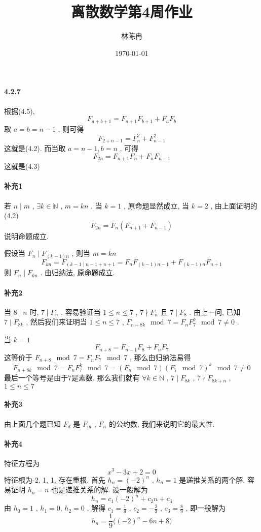 \documentclass[a4paper, UTF8]{ctexart}				%
\title{离散数学第4周作业}
\author{林陈冉}
\date{\today}
\numberwithin{equation}{section}				%
\begin{document}
    \maketitle										%
    \paragraph{4.2.7}\quad 
        根据(4.5), 
        \[
            F_{a + b + 1} = F_{a+1} F_{b+1} + F_a F_b
        \]
        取 $a = b = n - 1$ , 则可得 
        \[
            F_{2+n-1} = F_n^2 + F_{n-1}^2
        \]
        这就是(4.2). 而当取 $a = n-1, b = n$ , 可得 
        \[
            F_{2n} = F_{n+1}F_n + F_n F_{n-1}
        \]
        这就是(4.3)
    \paragraph{补充1}\quad
         若 $n\mid m$ , $\exists k \in \mathbb{N}$ , $m = kn$ . 当 $k = 1$ , 原命题显然成立, 当 $k = 2$ , 由上面证明的(4.2)
         \[
             F_{2n} = F_n(F_{n+1} + F_{n-1})
         \]
         说明命题成立.

         假设当 $F_n \mid F_{(k-1)n}$ , 则当 $m = kn$
         \[
             F_{k n} = F_{(k-1)n-1 + n + 1} = F_n F_{(k-1)n-1} + F_{(k-1)n} F_{n+1}
         \]
         则 $F_n \mid F_{kn}$ . 由归纳法, 原命题成立.
    \paragraph{补充2}\quad 
        当 $8 \mid n$ 时, $7 \mid F_n$ . 容易验证当 $1 \le n \le 7$ , $7 \nmid F_n$ 且 $7 \mid F_8$ . 由上一问, 已知 $7 \mid F_{8k}$ , 然后我们来证明当 $1 \le n \le 7$ , $F_{n + 8k} \mod 7 = F_n F_7^k \mod 7 \neq 0$ .
        
        当 $k = 1$ 
        \[
            F_{n+8} = F_{n-1}F_8 + F_n F_7
        \]
        这等价于 $F_{n+8} \mod 7 = F_n F_7 \mod 7$ , 那么由归纳法易得 
        \[
            F_{n + 8k} \mod 7 = F_n F_7^k \mod 7 = (F_n \mod 7)(F_7 \mod 7)^k \mod 7 \neq 0
        \]
        最后一个等号是由于7是素数. 那么我们就有 $\forall k \in \mathbb{N}$ , $7 \mid F_{8k}$ , $7 \nmid F_{8k + n}$ , $1 \le n \le 7$
    \paragraph{补充3}\quad 
        由上面几个题已知 $F_d$ 是 $F_m$ ,  $F_n$ 的公约数, 我们来说明它的最大性.
    \paragraph{补充4}\quad 
        特征方程为 
        \[
            x^3 - 3x + 2 = 0
        \]
        特征根为-2, 1, 1, 存在重根. 首先 $h_n = (-2)^n$ , $h_n = 1$ 是递推关系的两个解, 容易证明 $h_n = n$ 也是递推关系的解. 设一般解为 
        \[
            h_n = c_1 (-2)^n + c_2 n +c_3
        \]
        由 $h_0 = 1$ , $h_1 = 0$, $h_2 = 0$ , 解得 $c_1 = \frac{1}{9}$ , $c_2 = -\frac{2}{3}$ , $c_3 = \frac{8}{9}$ , 即一般解为 
        \[
            h_n = \frac{1}{9}\Big((-2)^n - 6n + 8\Big)
        \]
\end{document}
